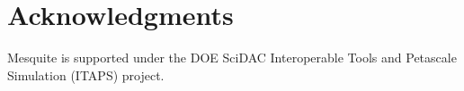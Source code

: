 \chapter{Acknowledgments}

Mesquite is supported under the DOE SciDAC Interoperable Tools
and Petascale Simulation (ITAPS) project. 


